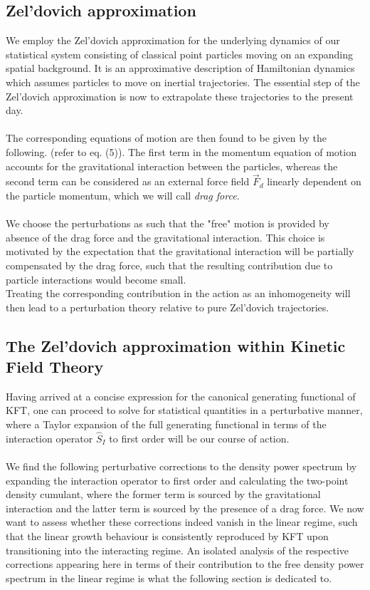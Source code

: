 \subsection{Zel'dovich approximation}
We employ the Zel'dovich approximation for the underlying dynamics of our statistical system consisting of classical point particles moving on an expanding spatial background.
It is an approximative description of Hamiltonian
dynamics which assumes particles to move on inertial trajectories.
The essential step of the Zel’dovich approximation is now to extrapolate these trajectories to the present day.
\\
 \\
The corresponding equations of motion are then found to be given by the following. (refer to eq. (5)).
The first term in the momentum equation of motion accounts for the gravitational interaction between the particles, whereas the second term can be considered as an external force field $\vec{F}_d$ linearly dependent on the particle momentum, which we will call \emph{drag force}.
\\
\\
We choose the perturbations as such that the "free" motion is provided by absence of the drag force and the gravitational interaction. This
choice is motivated by the expectation that the gravitational interaction will be partially
compensated by the drag force, such that the resulting contribution due to particle interactions would
become small.\\
Treating the corresponding contribution in the action as an inhomogeneity will then lead to a perturbation 
theory relative to pure Zel’dovich trajectories. \\
\subsection{The Zel'dovich approximation within Kinetic Field Theory}
Having arrived at a concise expression for the canonical generating functional of KFT,
one can proceed to solve for statistical quantities in a perturbative manner, where a Taylor expansion of the full generating
functional in terms of the interaction operator $\hat{S}_I$ to first order will be our course of action.
\\
\\
We find the following perturbative corrections to the density power spectrum by expanding the interaction operator to first order and calculating the two-point density cumulant, where the former term is sourced by the gravitational interaction and the latter term is sourced by the presence of a drag force. We now want to assess whether these corrections indeed vanish in the linear regime, such that the linear growth behaviour is consistently reproduced by KFT upon transitioning into the interacting regime. An isolated analysis of the respective corrections appearing here in terms of their contribution to the free density power spectrum in the linear regime is what the following section is dedicated to.
